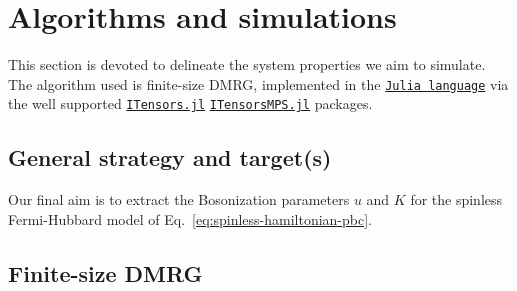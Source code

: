 \clearpage
\section{Algorithms and simulations}

This section is devoted to delineate the system properties we aim to simulate. The algorithm used is finite-size DMRG, implemented in the \href{https://docs.julialang.org/en/}{\texttt{Julia language}} via the well supported \href{https://itensor.github.io/ITensors.jl/stable/index.html}{\texttt{ITensors.jl}} \href{https://itensor.github.io/ITensorMPS.jl/stable/}{\texttt{ITensorsMPS.jl}} packages.

\subsection{General strategy and target(s)}

Our final aim is to extract the Bosonization parameters $u$ and $K$ for the spinless Fermi-Hubbard model of Eq.~\eqref{eq:spinless-hamiltonian-pbc}.

\subsection{Finite-size DMRG}

\todo